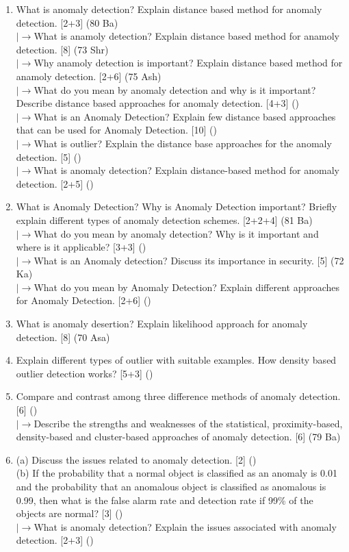 \documentclass[12pt]{article}
\newcommand{\lb}{\\$\left|\rightarrow\right.$}
\begin{document}
    \begin{enumerate}[topsep=0pt, noitemsep]
      \item What is anomaly detection? Explain distance based method for anomaly detection. \hfill [2+3] (80 Ba)
        \lb What is anamoly detection? Explain distance based method for anamoly detection. \hfill [8] (73 Shr)
        \lb Why anamoly detection is important? Explain distance based method for anamoly detection. \hfill [2+6] (75 Ash)
        \lb What do you mean by anomaly detection and why is it important? Describe distance based approaches for anomaly detection. \hfill [4+3] ()
        \lb What is an Anomaly Detection? Explain few distance based approaches that can be used for Anomaly Detection. \hfill [10] ()
        \lb What is outlier? Explain the distance base approaches for the anomaly detection. \hfill [5] ()
        \lb What is anomaly detection? Explain distance-based method for anomaly detection. \hfill [2+5] ()

      \item What is Anomaly Detection? Why is Anomaly Detection important? Briefly explain different types of anomaly detection schemes. \hfill [2+2+4] (81 Ba)
        \lb What do you mean by anomaly detection? Why is it important and where is it applicable? \hfill [3+3] ()
        \lb What is an Anomaly detection? Discuss its importance in security. \hfill [5] (72 Ka)
        \lb What do you mean by Anomaly Detection? Explain different approaches for Anomaly Detection. \hfill [2+6] ()

      \item What is anomaly desertion? Explain likelihood approach for anomaly detection. \hfill [8] (70 Asa)

      \item Explain different types of outlier with suitable examples. How density based outlier detection works? \hfill [5+3] ()

      \item Compare and contrast among three difference methods of anomaly detection. \hfill [6] ()
        \lb Describe the strengths and weaknesses of the statistical, proximity-based, density-based and cluster-based approaches of anomaly detection. \hfill [6] (79 Ba)

      \item (a) Discuss the issues related to anomaly detection. \hfill [2] ()\\
        (b) If the probability that a normal object is classified as an anomaly is 0.01 and the probability that an anomalous object is classified as anomalous is 0.99, then what is the false alarm rate and detection rate if 99\% of the objects are normal? \hfill [3] ()
        \lb What is anomaly detection? Explain the issues associated with anomaly detection. \hfill [2+3] ()


\end{enumerate}
\end{document}
